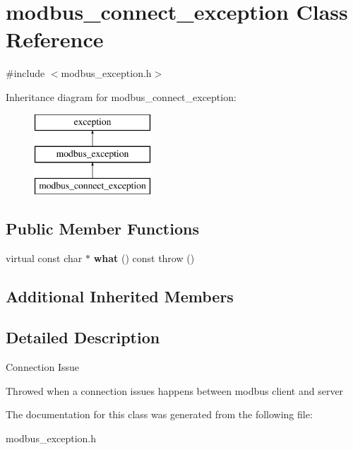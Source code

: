 \hypertarget{classmodbus__connect__exception}{}\section{modbus\+\_\+connect\+\_\+exception Class Reference}
\label{classmodbus__connect__exception}


{\ttfamily \#include $<$modbus\+\_\+exception.\+h$>$}

Inheritance diagram for modbus\+\_\+connect\+\_\+exception\+:\begin{figure}[H]
\begin{center}
\leavevmode
\includegraphics[height=3.000000cm]{classmodbus__connect__exception}
\end{center}
\end{figure}
\subsection*{Public Member Functions}
\begin{DoxyCompactItemize}
\item 
\mbox{\label{classmodbus__connect__exception_acde6853b845c8fb361a57e9d5732a8bd}} 
virtual const char $\ast$ {\bfseries what} () const  throw ()
\end{DoxyCompactItemize}
\subsection*{Additional Inherited Members}


\subsection{Detailed Description}
Connection Issue

Throwed when a connection issues happens between modbus client and server 

The documentation for this class was generated from the following file\+:\begin{DoxyCompactItemize}
\item 
modbus\+\_\+exception.\+h\end{DoxyCompactItemize}
